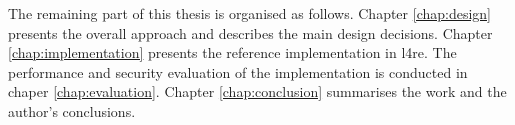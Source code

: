 The remaining part of this thesis is organised as follows.
Chapter \ref{chap:design} presents the overall approach and describes the main design decisions.
Chapter \ref{chap:implementation} presents the reference implementation in \ac{l4re}.
The performance and security evaluation of the implementation is conducted in chaper \ref{chap:evaluation}.
Chapter \ref{chap:conclusion} summarises the work and the author's conclusions.
